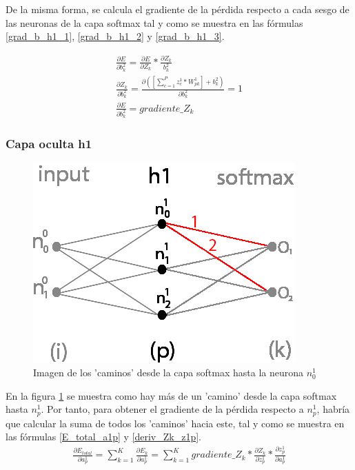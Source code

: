 De la misma forma, se calcula el gradiente de la pérdida respecto a cada sesgo de las neuronas de la capa softmax tal y como se muestra en las fórmulas \ref{grad_b_h1_1}, \ref{grad_b_h1_2} y \ref{grad_b_h1_3}.

\begin{gather}
	\frac{\partial E}{\partial b^2_k} = \frac{\partial E}{\partial Z_k} * \frac{\partial Z_k}{b^2_k} \label{grad_b_h1_1} \\
	\frac{\partial Z_k }{\partial b^2_k } = \frac{\partial ([\sum_{c=1}^{P} z^1_c * W^1_{pk}] + b^2_k) }{\partial b^2_k } = 1 \label{grad_b_h1_2} \\
	\frac{\partial E}{\partial b^2_k} = gradiente\_Z_k \label{grad_b_h1_3}
\end{gather}

\subsubsection{Capa oculta h1}

\begin{figure}[H]
	\centering
	\includegraphics[scale=0.35]{imagenes/nn_caminos_posibles.jpg}  
	\caption{Imagen de los 'caminos' desde la capa softmax hasta la neurona $n^1_0$}
	\label{nn_caminos_posibles}
\end{figure}

En la figura \ref{nn_caminos_posibles} se muestra como hay más de un 'camino' desde la capa softmax hasta $n^1_p$. Por tanto, para obtener el gradiente de la pérdida respecto a $n^1_p$, habría que calcular la suma de todos los 'caminos' hacia este, tal y como se muestra en las fórmulas \ref{E_total_a1p} y \ref{deriv_Zk_z1p}. \\

\begin{gather}
	\frac{\partial E_{total}}{\partial a^1_p} = \sum_{k=1}^K \frac{\partial E_k}{\partial a^1_p} = \sum_{k=1}^K  gradiente\_Z_k * \frac{\partial Z_k}{\partial z^1_p} * \frac{\partial z^1_p}{\partial a^1_p}
	\label{E_total_a1p}
\end{gather}

